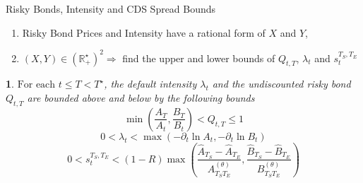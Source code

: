 \documentclass[serif]{beamer}
\newtheorem{proposition}[theorem]{\translate{Proposition}}
\newcommand\RR {\mathbb{R}}
\numberwithin{equation}{section}
\begin{document}
\begin{frame}{Risky Bonds, Intensity and CDS Spread Bounds}
 \begin{enumerate}
 \item<1->  Risky Bond Prices and Intensity have a rational form of $X$ and $Y$,
 \item<2->  $(X,Y)\in (\RR^\star_+)^2 \Rightarrow$ find the upper and lower bounds of $Q_{t,T}$, $\lambda_t$ and $s_{t}^{T_S,T_E}$

\end{enumerate}
\begin{proposition}\label{Proposition::bounds}
\emph{
$\text{For each } t\leq T < T^\star$, the default intensity $\lambda_t$ and the undiscounted risky bond $Q_{t,T}$ are bounded above and below by the following bounds
\begin{equation}
 \min\left( \frac{A_T}{A_t}, \frac{B_T}{B_t}\right) < Q_{t,T} \leq 1
\end{equation}
\begin{equation}
 0 <\lambda_t < \max\left(-\partial_t\ln{A_t}, -\partial_t \ln B_t\right)
\end{equation}}
 \begin{equation}
 0 <s_{t}^{T_S,T_E} < (1-R)\max\left(\frac{ \hat A_{T_S}-\hat A_{T_E}}{A^{(\theta)}_{T_ST_E}}, \frac{ \hat B_{T_S}-\hat B_{T_E}}{B^{(\theta)}_{T_ST_E}}\right)
\end{equation}
\end{proposition}

\end{frame}
\end{document}
